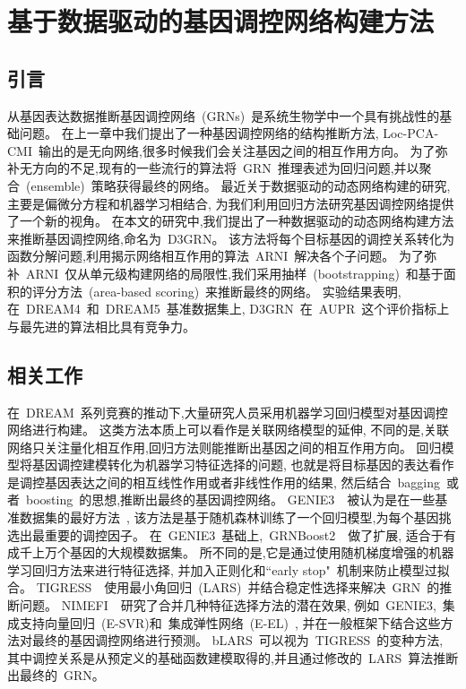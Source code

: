 \section{基于数据驱动的基因调控网络构建方法}
\label{sec:d3grn}

\subsection{引言}

从基因表达数据推断基因调控网络~(GRNs)~是系统生物学中一个具有挑战性的基础问题。
在上一章中我们提出了一种基因调控网络的结构推断方法,
Loc-PCA-CMI~输出的是无向网络,很多时候我们会关注基因之间的相互作用方向。
为了弥补无方向的不足,现有的一些流行的算法将~GRN~推理表述为回归问题,并以聚合~(ensemble)~策略获得最终的网络。
最近关于数据驱动的动态网络构建的研究,主要是偏微分方程和机器学习相结合, 
为我们利用回归方法研究基因调控网络提供了一个新的视角。
在本文的研究中,我们提出了一种数据驱动的动态网络构建方法来推断基因调控网络,命名为~D3GRN。
该方法将每个目标基因的调控关系转化为函数分解问题,利用揭示网络相互作用的算法~ARNI~解决各个子问题。
为了弥补~ARNI~仅从单元级构建网络的局限性,我们采用抽样~(bootstrapping)~和基于面积的评分方法~(area-based scoring)~来推断最终的网络。
实验结果表明, 在~DREAM4~和~DREAM5~基准数据集上, D3GRN~在~AUPR~这个评价指标上与最先进的算法相比具有竞争力。

\subsection{相关工作}

在~DREAM~系列竞赛的推动下,大量研究人员采用机器学习回归模型对基因调控网络进行构建。
这类方法本质上可以看作是关联网络模型的延伸,
不同的是,关联网络只关注量化相互作用,回归方法则能推断出基因之间的相互作用方向。
回归模型将基因调控建模转化为机器学习特征选择的问题,
也就是将目标基因的表达看作是调控基因表达之间的相互线性作用或者非线性作用的结果,
然后结合~bagging~或者~boosting~的思想,推断出最终的基因调控网络。
GENIE3~\cite{huynh2010inferring}~被认为是在一些基准数据集的最好方法~\cite{marbach2010revealing},
该方法是基于随机森林训练了一个回归模型,为每个基因挑选出最重要的调控因子。
在~GENIE3~基础上,~GRNBoost2~\cite{moerman2019grnboost2}~做了扩展, 适合于有成千上万个基因的大规模数据集。
所不同的是,它是通过使用随机梯度增强的机器学习回归方法来进行特征选择, 
并加入正则化和``early stop"~机制来防止模型过拟合。 
TIGRESS~\cite{Haury2012}~使用最小角回归~(LARS)~并结合稳定性选择来解决~GRN~的推断问题。
NIMEFI~\cite{ruyssinck2014nimefi}~研究了合并几种特征选择方法的潜在效果,
例如~GENIE3,~集成支持向量回归~(E-SVR)和~集成弹性网络~(E-EL)~\cite{zou2005regularization},
并在一般框架下结合这些方法对最终的基因调控网络进行预测。
bLARS~\cite{singh2016blars}可以视为~TIGRESS~的变种方法,
其中调控关系是从预定义的基础函数建模取得的,并且通过修改的~LARS~算法推断出最终的~GRN。

